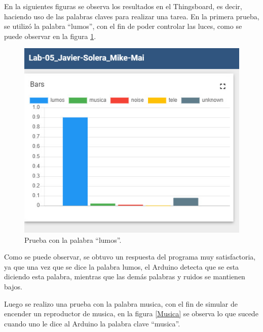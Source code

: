 En la siguientes figuras se observa los resultados en el Thingsboard, es decir, haciendo uso de las palabras claves para realizar una tarea.
En la primera prueba, se utilizó la palabra ``lumos'', con el fin de poder controlar las luces,  como se puede observar en la figura \ref{lumos}.

\begin{figure}[H]
    \centering
    \includegraphics[width=\textwidth]{Imagenes/lumos.jpg}
    \caption{Prueba con la palabra ``lumos''.}
    \label{lumos}
\end{figure}

Como se puede observar, se obtuvo un respuesta del programa muy satisfactoria, ya que una vez que se dice la palabra lumos, el Arduino detecta que se esta diciendo esta palabra, mientras que las demás palabras y ruidos se mantienen bajos.

Luego se realizo una prueba con la palabra musica, con el fin de simular de encender un reproductor de musica, en la figura \ref{Musica} se observa lo que sucede cuando uno le dice al Arduino la palabra clave ``musica''.

